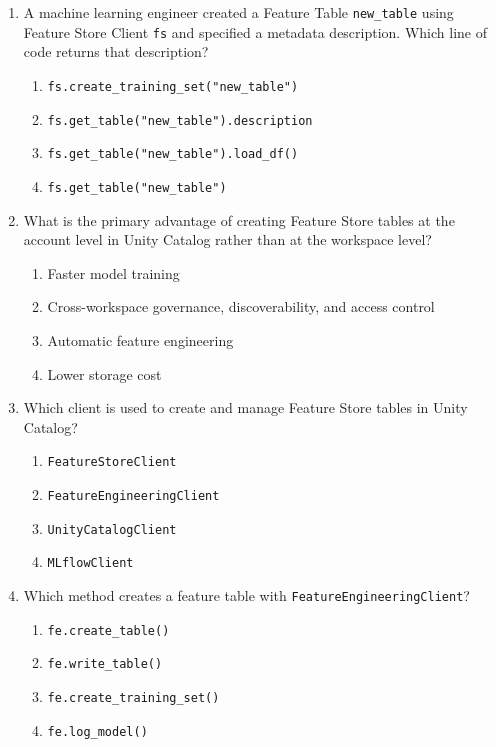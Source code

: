\documentclass[11pt]{article}
\begin{document}
	\begin{enumerate}[leftmargin=*, label=\textbf{Q\arabic*.}]
		
		\item A machine learning engineer created a Feature Table \texttt{new\_table} using Feature Store Client \texttt{fs} and specified a metadata description. Which line of code returns that description?
		\begin{enumerate}[label=(\alph*)]
			\item \texttt{fs.create\_training\_set("new\_table")}
			\item \texttt{fs.get\_table("new\_table").description}
			\item \texttt{fs.get\_table("new\_table").load\_df()}
			\item \texttt{fs.get\_table("new\_table")}
		\end{enumerate}
		
		\item What is the primary advantage of creating Feature Store tables at the account level in Unity Catalog rather than at the workspace level?
		\begin{enumerate}[label=(\alph*)]
			\item Faster model training
			\item Cross-workspace governance, discoverability, and access control
			\item Automatic feature engineering
			\item Lower storage cost
		\end{enumerate}
		
		\item Which client is used to create and manage Feature Store tables in Unity Catalog?
		\begin{enumerate}[label=(\alph*)]
			\item \texttt{FeatureStoreClient}
			\item \texttt{FeatureEngineeringClient}
			\item \texttt{UnityCatalogClient}
			\item \texttt{MLflowClient}
		\end{enumerate}
		
		\item Which method creates a feature table with \texttt{FeatureEngineeringClient}?
		\begin{enumerate}[label=(\alph*)]
			\item \texttt{fe.create\_table()}
			\item \texttt{fe.write\_table()}
			\item \texttt{fe.create\_training\_set()}
			\item \texttt{fe.log\_model()}
		\end{enumerate}
		

\end{enumerate}
\end{document}
